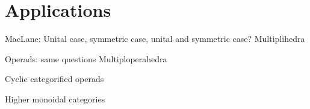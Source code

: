 
\section{Applications} 
\label{s:applications}

MacLane: Unital case, symmetric case, unital and symmetric case?
Multiplihedra

Operads: same questions
Multiploperahedra

Cyclic categorified operads

Higher monoidal categories

